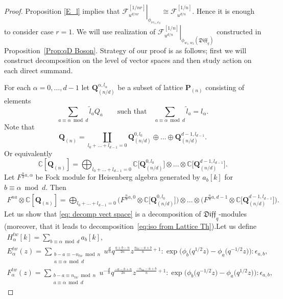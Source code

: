 \documentclass[pdftex]{sigma}
\numberwithin{equation}{section}
\theoremstyle{definition}
\newcommand{\qD}{\mathfrak{Diff}_q}
\newcommand{\Q}{\mathbf{Q}_{(n)}}
\renewcommand{\P}{\mathbf{P}_{(n)}}
\begin{document}
\begin{proof}Proposition \ref{E_l} implies that $\left. \mathcal{F}^{[1/nr]}_{u^{d/nr}} \right|_{\phi_{re_1,e_2}} \cong \mathcal{F}^{[1/n]}_{u^{d/n}}$. Hence it is enough to consider case $r=1$. We will use realization of $\left. \mathcal{F}^{[1/n]}_{u^{d/n}} \right|_{\phi_{w_1,w_2}(\qD)}$ constructed in Proposition~\ref{Prop:qD Boson}. Strategy of our proof is as follows; first we will construct decomposition on the level of vector spaces and then study action on each direct summand.

For each $\alpha = 0, \dots, d-1$ let $\mathbf{Q}_{(n/d)}^{\alpha, l_{\alpha}}$ be a subset of lattice $\P$ consisting of elements
\[
\sum_{a \equiv \alpha \bmod{d}} \tilde{l}_a Q_a \qquad \text{such that} \quad \sum_{a \equiv \alpha \bmod{d}} \tilde{l}_a = l_{\alpha}.
\]
Note that
\[
\Q = \coprod_{l_0 + \dots + l_{d-1} = 0} \mathbf{Q}_{(n/d)}^{0, l_0} \oplus \dots \oplus \mathbf{Q}_{(n/d)}^{d-1, l_{d-1}}.
\]
Or equivalently
\[
\mathbb{C}[\Q] = \bigoplus_{l_0 + \dots + l_{d-1} = 0} \mathbb{C}\big [\mathbf{Q}_{(n/d)}^{0, l_0} \big] \otimes \dots \otimes \mathbb{C}\big [ \mathbf{Q}_{(n/d)}^{d-1, l_{d-1}} \big].
\]
Let $F^{\frac{n}{d}a, \alpha}$ be Fock module for Heisenberg algebra generated by $a_b[k]$ for $b \equiv \alpha \bmod{d}$. Then
\begin{gather}
F^{na} \otimes \mathbb{C}[\Q] = \bigoplus_{l_0 + \dots + l_{d-1} = 0} \big( F^{\frac{n}{d}a, 0} \otimes \mathbb{C}\big[\mathbf{Q}_{(n/d)}^{0, l_0} \big] \big) \otimes \dots \otimes \big( F^{\frac{n}{d}a, d-1} \otimes \mathbb{C}\big[ \mathbf{Q}_{(n/d)}^{d-1, l_{d-1}} \big] \big).\!\!\!\! \label{eq: decomp vect space}
\end{gather}
Let us show that \eqref{eq: decomp vect space} is a decomposition of $\qD$-modules (moreover, that it leads to decomposition~\eqref{eq:iso from Lattice Th}).Let us define
\begin{gather}
H_{\alpha}^{tw}[k] = \sum_{b \equiv \alpha \bmod d} a_b[k], \label{eq: H alpha tw} \\
E^{tw}_{\alpha}(z) = \sum_{\substack{b-a \equiv -n_{tw} \bmod n \\ a \equiv \alpha \bmod d}} u^{\frac{d}{n}} q^{\frac{a+b-n}{2n}} z^{\frac{n_{tw}-a+b}{n}+1} : \! \exp \big( \phi_b\big(q^{1/2} z\big) - \phi_a\big(q^{-1/2} z\big) \big) \! : \epsilon_{a,b},
\\
F_{\alpha}^{tw}(z) = \sum_{\substack{b-a \equiv n_{tw} \bmod n\\ a \equiv \alpha \bmod d}} u^{-\frac{d}{n}} q^{ \frac{-a-b+n}{2n} } z^{\frac{-n_{tw}-a+b}{n}+1} : \! \exp \big( \phi_b\big(q^{-1/2} z\big) - \phi_a\big(q^{1/2} z\big) \big) \! : \epsilon_{a,b}, \label{eq: F alpha tw}

\end{gather}
\end{proof}
\end{document}

